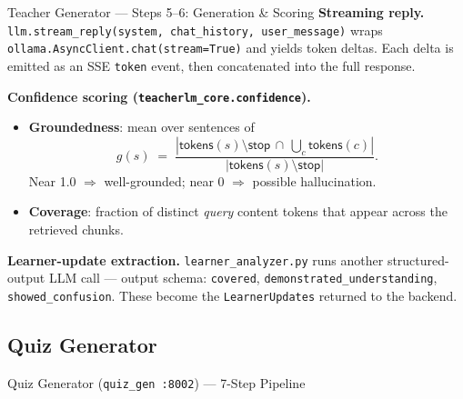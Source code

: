 \documentclass[aspectratio=169, 10pt]{beamer}
\begin{document}
\begin{frame}{Teacher Generator --- Steps 5--6: Generation \& Scoring}
  \scriptsize
  \textbf{Streaming reply.}
  \texttt{llm.stream\_reply(system, chat\_history, user\_message)} wraps
  \texttt{ollama.AsyncClient.chat(stream=True)} and yields token deltas.
  Each delta is emitted as an SSE \texttt{token} event, then
  concatenated into the full response.

  \textbf{Confidence scoring (\texttt{teacherlm\_core.confidence}).}
  \begin{itemize}
    \setlength\itemsep{0pt}
    \item \textbf{Groundedness}: mean over sentences of
          \[
            g(s) \;=\; \frac{|\textsf{tokens}(s) \setminus \textsf{stop} \,\cap\, \bigcup_c \textsf{tokens}(c)|}{|\textsf{tokens}(s) \setminus \textsf{stop}|}.
          \]
          Near 1.0 $\Rightarrow$ well-grounded; near 0 $\Rightarrow$ possible
          hallucination.
    \item \textbf{Coverage}: fraction of distinct \textit{query} content
          tokens that appear across the retrieved chunks.
  \end{itemize}

  \textbf{Learner-update extraction.} \texttt{learner\_analyzer.py}
  runs another structured-output LLM call --- output schema:
  \texttt{covered}, \texttt{demonstrated\_understanding}, \texttt{showed\_confusion}.
  These become the \texttt{LearnerUpdates} returned to the backend.
\end{frame}

\subsection*{Quiz Generator}

\begin{frame}{Quiz Generator (\texttt{quiz\_gen :8002}) --- 7-Step Pipeline}
  \centering
  \scriptsize
\end{frame}
\end{document}

